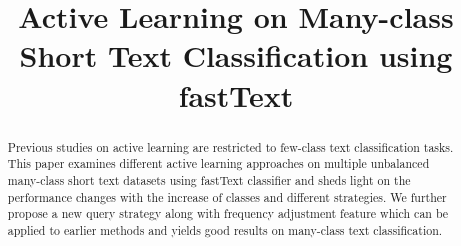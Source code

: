 \documentclass{article}
\title{Active Learning on Many-class Short Text Classification using fastText}
\newcommand{\KZ}[1]{\textcolor{blue}{Kenny: #1}}
\begin{document}
\maketitle

\begin{abstract}

Previous studies on active learning are restricted to few-class text classification tasks. 
This paper examines different active learning approaches on multiple unbalanced 
many-class short text datasets using fastText classifier and sheds light 
on the performance changes with the increase of classes and different strategies. 
We further propose a new query strategy along with frequency adjustment feature 
which can be applied to earlier methods and yields good results on many-class text classification.
\end{abstract}








% 


% 


\end{document}
